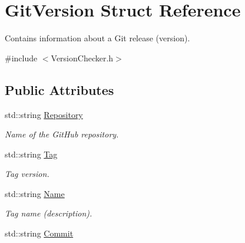 \hypertarget{structGitVersion}{\section{Git\-Version Struct Reference}
\label{structGitVersion}
}


Contains information about a Git release (version).  




{\ttfamily \#include $<$Version\-Checker.\-h$>$}

\subsection*{Public Attributes}
\begin{DoxyCompactItemize}
\item 
\hypertarget{structGitVersion_ad47dce1972d1058648429996c6ed02b0}{std\-::string \hyperlink{structGitVersion_ad47dce1972d1058648429996c6ed02b0}{Repository}}\label{structGitVersion_ad47dce1972d1058648429996c6ed02b0}

\begin{DoxyCompactList}\small\item\em Name of the Git\-Hub repository. \end{DoxyCompactList}\item 
\hypertarget{structGitVersion_ad436b796df94381fe3af70559868ed55}{std\-::string \hyperlink{structGitVersion_ad436b796df94381fe3af70559868ed55}{Tag}}\label{structGitVersion_ad436b796df94381fe3af70559868ed55}

\begin{DoxyCompactList}\small\item\em Tag version. \end{DoxyCompactList}\item 
\hypertarget{structGitVersion_a437b0aaee8685d61cccde69ad4ae73ec}{std\-::string \hyperlink{structGitVersion_a437b0aaee8685d61cccde69ad4ae73ec}{Name}}\label{structGitVersion_a437b0aaee8685d61cccde69ad4ae73ec}

\begin{DoxyCompactList}\small\item\em Tag name (description). \end{DoxyCompactList}\item 
\hypertarget{structGitVersion_a0a7fcfae969cad2cb90dc0353df5bf49}{std\-::string \hyperlink{structGitVersion_a0a7fcfae969cad2cb90dc0353df5bf49}{Commit}}\label{structGitVersion_a0a7fcfae969cad2cb90dc0353df5bf49}


\end{DoxyCompactItemize}

